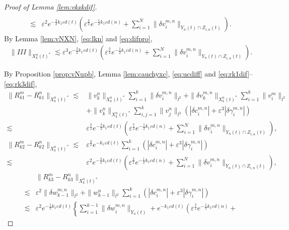 \documentclass[11pt]{amsart}
\theoremstyle{remark}
\numberwithin{equation}{section}
\begin{document}
\begin{proof}[Proof of Lemma \ref{lem:vkxkdif}]
\begin{equation}
\begin{split}
\\ \lesssim & {\varepsilon}^2e^{-\frac32k_1{\varepsilon} d(t)}\left(
{\varepsilon}^{\frac32}e^{-\frac12k_1{\varepsilon} d(n)}+\sum_{i=1}^N\|{\delta v}_i^{m,n}\|_{Y_n(t)\cap Z_{i,n}(t)}\right).
  \end{split}
\end{equation}
By Lemma \ref{lem:vNXN}, \eqref{eq:lkn} and \eqref{eq:difpro},
\begin{align*}
\|III\|_{X_k^n(t)^*} \lesssim
{\varepsilon}^3e^{-\frac32k_1{\varepsilon} d(t)}\left({\varepsilon}^{\frac32}e^{-\frac12k_1{\varepsilon} d(n)}
+\sum_{i=1}^N\|{\delta v}_i^{m,n}\|_{Y_n(t)\cap Z_{i,n}(t)}\right).
\end{align*}
\par
By Proposition \ref{prop:vNupb}, Lemma \ref{lem:cauchyxc},  
\eqref{eq:ucdiff} and \eqref{eq:rk1dif}--\eqref{eq:rk3dif},
\begin{align*}
\|R_{k1}^m-R_{k1}^n\|_{X_k^n(t)^*} \lesssim &
\|v_k^n\|_{X_k^n(t)^*}\sum_{i=1}^k \|{\delta v}_i^{m,n}\|_{l^2}
+\|{\delta v}_k^{m,n}\|_{X_k^n(t)^*}\sum_{i=1}^k\|v_i^m\|_{l^2}
\\ &+\|v_k^n\|_{X_k^n(t)^*}\sum_{i, j=1}^k\|v_j^n\|_{l^2}(|{\delta c}^{m,n}_i|+{\varepsilon}^3|{\delta\gamma}^{m,n}_i|)
\\ \lesssim &
{\varepsilon}^{\frac32}e^{-\frac32k_1{\varepsilon} d(t)}\left({\varepsilon}^{\frac72}e^{-\frac12k_1{\varepsilon} d(n)}+
\sum_{i=1}^N\|{\delta v}_i^{m,n}\|_{Y_n(t)\cap Z_{i,n}(t)}\right),
\end{align*}
\begin{align*}
\|R_{k2}^m-R_{k2}^n\|_{X_k^n(t)^*}\lesssim &
{\varepsilon}^{\frac32}e^{-k_1{\varepsilon} d(t)}\sum_{i=1}^k(|{\delta c}^{m,n}_i|+{\varepsilon}^3|{\delta\gamma}^{m,n}_i|)
\\ \lesssim &
{\varepsilon}^2e^{-\frac32k_1{\varepsilon} d(t)}\left({\varepsilon}^{\frac32}e^{-\frac12k_1{\varepsilon} d(n)}
+\sum_{i=1}^N\|{\delta v}_i^{m,n}\|_{Y_n(t)\cap Z_{i,n}(t)}\right),
\end{align*}
\begin{align*}
& \|R_{k3}^m-R_{k3}^n\|_{X_k^n(t)^*}\\ \lesssim & {\varepsilon}^2\|{\delta w}^{m,n}_{k-1}\|_{l^2}
+\|w_{k-1}^n\|_{l^2}\sum_{i=1}^k(|{\delta c}^{m,n}_i|+{\varepsilon}^3|{\delta\gamma}^{m,n}_i|)
\\ \lesssim &
{\varepsilon}^2e^{-\frac12k_1{\varepsilon} d(t)}\left\{\sum_{i=1}^{k-1}\|{\delta w}^{m,n}_i\|_{Y_n(t)}
+e^{-k_1{\varepsilon} d(t)}\left({\varepsilon}^{\frac32}e^{-\frac12k_1{\varepsilon} d(n)}+

\end{align*}
\end{proof}
\end{document}
